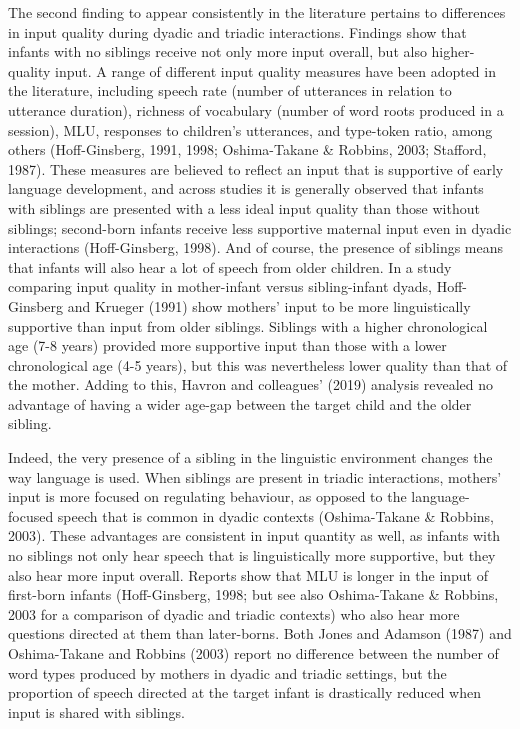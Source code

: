 \documentclass[
  english,
  man,floatsintext]{apa6}
\begin{document}
The second finding to appear consistently in the literature pertains to differences in input quality during dyadic and triadic interactions. Findings show that infants with no siblings receive not only more input overall, but also higher-quality input. A range of different input quality measures have been adopted in the literature, including speech rate (number of utterances in relation to utterance duration), richness of vocabulary (number of word roots produced in a session), MLU, responses to children's utterances, and type-token ratio, among others (Hoff-Ginsberg, 1991, 1998; Oshima-Takane \& Robbins, 2003; Stafford, 1987). These measures are believed to reflect an input that is supportive of early language development, and across studies it is generally observed that infants with siblings are presented with a less ideal input quality than those without siblings; second-born infants receive less supportive maternal input even in dyadic interactions (Hoff-Ginsberg, 1998). And of course, the presence of siblings means that infants will also hear a lot of speech from older children. In a study comparing input quality in mother-infant versus sibling-infant dyads, Hoff-Ginsberg and Krueger (1991) show mothers' input to be more linguistically supportive than input from older siblings. Siblings with a higher chronological age (7-8 years) provided more supportive input than those with a lower chronological age (4-5 years), but this was nevertheless lower quality than that of the mother. Adding to this, Havron and colleagues' (2019) analysis revealed no advantage of having a wider age-gap between the target child and the older sibling.

Indeed, the very presence of a sibling in the linguistic environment changes the way language is used. When siblings are present in triadic interactions, mothers' input is more focused on regulating behaviour, as opposed to the language-focused speech that is common in dyadic contexts (Oshima-Takane \& Robbins, 2003). These advantages are consistent in input quantity as well, as infants with no siblings not only hear speech that is linguistically more supportive, but they also hear more input overall. Reports show that MLU is longer in the input of first-born infants (Hoff-Ginsberg, 1998; but see also Oshima-Takane \& Robbins, 2003 for a comparison of dyadic and triadic contexts) who also hear more questions directed at them than later-borns. Both Jones and Adamson (1987) and Oshima-Takane and Robbins (2003) report no difference between the number of word types produced by mothers in dyadic and triadic settings, but the proportion of speech directed at the target infant is drastically reduced when input is shared with siblings.
\end{document}
